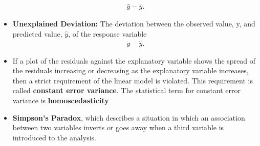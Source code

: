 \documentclass{report}
\begin{document}
\begin{itemize}
\begin{align*}
                \hat{y}-\overline{y}
            .\end{align*}
        \item \textbf{Unexplained Deviation:} The deviation between the observed value, y, and predicted value, $\hat{y} $, of the response variable
            \begin{align*}
                y - \hat{y}
            .\end{align*}
        \item     If a plot of the residuals against the explanatory variable shows the spread of the residuals increasing or decreasing as the explanatory variable increases, then a strict requirement of the linear model is violated.     This requirement is called \textbf{constant error variance}. The statistical term for constant error variance is \textbf{homoscedasticity}

        \item \textbf{Simpson's Paradox}, which describes a situation in which an association between two variables inverts or goes away when a third variable is introduced to the analysis.
        \end{itemize}
\end{document}

